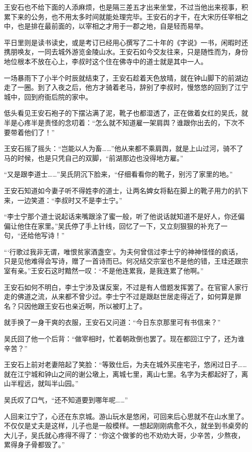 王安石也不给下面的人添麻烦，也是隔三差五才出来坐堂，不过当他出来视事，积累下来的公务，也不用太多时间就能处理完毕。王安石的才干，在大宋历任宰相之中，也是排在最前面的，以宰相之才用于一郡之地，自是轻而易举。

平日里则是读书读史，或是考订已经用心撰写了二十年的《字说》一书，闲暇时还携朋唤友，一同去城外游览金陵山水。王安石如今交友往来，只是随性而为，身份地位根本不放在心上，李叔时这个住在佛寺中的道士就是其中一人。

一场暴雨下了小半个时辰就结束了，王安石趁着天色放晴，就在钟山脚下的前湖边走了一圈。到了入夜之后，他方才骑着老马，辞别了李叔时，慢悠悠的回到了江宁城中，回到府衙后院的家中。

低头看见王安石袍子的下摆沾满了泥，靴子也都湿透了，正在做着女红的吴氏，就半是心疼半是责怪的念叨着：“怎么就不知道雇一架肩舆？谁跟你出去的，下次不要带着他们了！”

王安石摇了摇头：“岂能以人为畜……”他从来都不乘肩舆，就是上山过河，骑不了马的时候，也是只凭自己的双脚，“前湖那边也没得地方雇。”

“又是跟李道士……”吴氏阴沉下脸来，“仔细看看你的靴子，别污了家里的地。”

王安石知道如今妻子听不得姓李的道士，让两名婢女将黏在脚上的靴子用力的扒下来，一边笑道：“李叔时又不是李士宁。”

“李士宁那个道士说起话来嘴跟涂了蜜一般，听了他说话就知道不是好人，你还偏偏让他住在家里。”吴氏停了手上针线，回忆了一下，又立刻狠狠的补充了一句，“还给他写诗！”

“‘行歌过我非无谓，唯恨贫家酒盏空’。为夫何曾信过李士宁的神神怪怪的疯话，只是见他难得会写诗，赠了一首诗而已。何况结交宗室也不是他的错，王珪还跟宗室有亲。”王安石这时黯然一叹：“不是他连累我，是我连累了他啊。”

王安石如何不明白，李士宁涉及谋反案，不过是有人借题发挥罢了。在官宦人家行走的佛道之流，从来都不曾少过。李士宁不过是跟赵世居走得近了，如何算是罪名？只因他跟王安石也亲近啊，所以被盯上了。

就手换了一身干爽的衣服，王安石又问道：“今日东京那里可有书信来？”

吴氏回了他一个后背：“做宰相时，忙着朝政倒也罢了。现在都回江宁了，还为谁辛苦？”

王安石上前对老妻陪起了笑脸：“等致仕后，为夫在城外买座宅子，悠闲过日子……就在江宁城和钟山之间的谢公墩上，离城七里，离山七里。名字为夫都起好了，离山半程远，就叫半山园。”

吴氏叹了口气，“还不知道要到哪年呢……”

人回来江宁了，心还在东京城。游山玩水是悠闲，可回来后心思就不在山水里了。不仅仅是丈夫是这样，儿子也是一般模样。一想起刚刚病愈不久，就坐到书桌旁的大儿子，吴氏就心疼得不得了：“你这个做爹的也不劝劝大哥，少辛苦，少熬夜，累得身子骨都毁了。”

